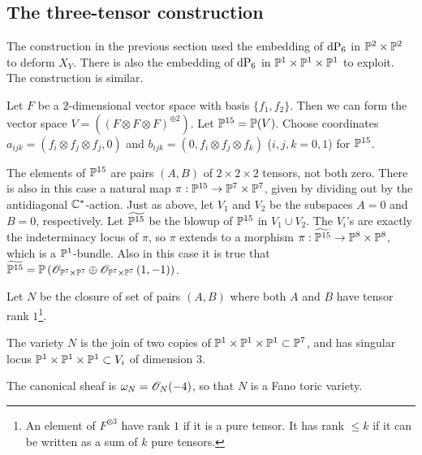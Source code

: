 \subsection{The three-tensor construction}

The construction in the previous section used the embedding of $\dP6$ in $\P^2 \times \P^2$ to deform $X_Y$. There is also the embedding of $\dP6$ in $\P^1 \times \P^1 \times \P^1$ to exploit. The construction is similar.

Let $F$ be a $2$-dimensional vector space with basis $\{f_1,f_2\}$. Then we can form the vector space $V = ((F \otimes F \otimes F)^{\oplus 2})$. Let $\P^{15}=\P(V)$. Choose coordinates $a_{ijk}=(f_i \otimes f_j \otimes f_j,0)$ and $b_{ijk}=(0,f_i\otimes f_j \otimes f_k)$ ($i,j,k=0,1$) for $\P^{15}$. 

The elements of $\P^{15}$ are pairs $(A,B)$ of $2 \times 2 \times 2$ tensors, not both zero. There is also in this case a natural map $\pi:\P^{15} \to \P^7 \times \P^7$, given by dividing out by the antidiagonal $\C^\ast$-action. Just as above, let $V_1$ and $V_2$ be the subspaces $A=0$ and $B=0$, respectively. Let $\widetilde{\P^{15}}$ be the blowup of $\P^{15}$ in $V_1 \cup V_2$. The $V_i$'s are exactly the indeterminacy locus of $\pi$, so $\pi$ extends to a morphism $\pi:\widetilde{\P^{15}} \to \P^8 \times \P^8$, which is a $\P^1$-bundle. Also in this case it is true that $\widetilde{\P^{15}}=\P\left(\OO_{\P^7 \times \P^7} \oplus \OO_{\P^7 \times \P^7}\left(1,-1\right)\right)$.

Let $N$ be the closure of set of pairs $(A,B)$ where both $A$ and $B$ have tensor rank $1$\footnote{An element of $F^{\otimes 3}$ have rank $1$ if it is a pure tensor. It has rank $\leq k$ if it can be written as a sum of $k$ pure tensors.}.

\begin{proposition}
The variety $N$ is the join of two copies of $\P^1 \times \P^1 \times \P^1 \subset \P^7$, and has singular locus $\P^1 \times \P^1 \times \P^1 \subset V_i$ of dimension $3$.

The canonical sheaf is $\omega_N = \OO_N(-4)$, so that $N$ is a Fano toric variety.
\end{proposition}

